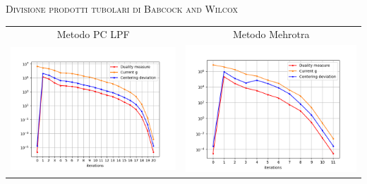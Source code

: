 \begin{frame}{\textsc{\LARGE \textcolor{iris}{Divisione prodotti tubolari di Babcock and Wilcox}}}
	\centering
	\begin{tabular}{c@{}c}
		\small{Metodo PC LPF} & \small{Metodo Mehrotra} \\
		\includegraphics[scale = 0.33]{tub_PCLPF}
		&\includegraphics[scale = 0.33]{tub_MER2}\\ 
	\end{tabular}
\end{frame}


